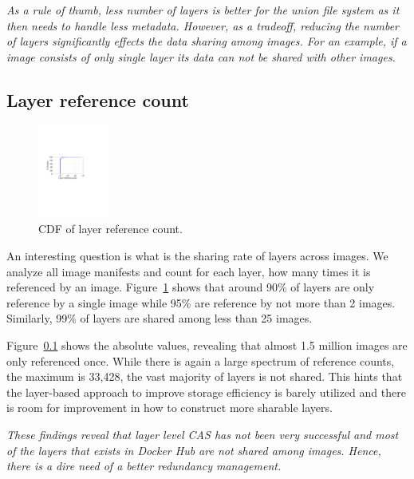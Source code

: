 \emph{As a rule of thumb, less number of layers is better for the union file
system as it then needs to handle less metadata. However, as a tradeoff,
reducing the number of layers significantly effects the data sharing among images.
For an example, if a image consists of only single layer its data can not be shared
with other images.}
%

\subsection{Layer reference count}

\begin{figure}
	\centering
	\includegraphics[width=0.21\textwidth]{graphs/shared-cnt-cdf.pdf}
	\caption{CDF of layer reference count.
	}
	\label{fig:ref_count}
\end{figure}

An interesting question is what is the sharing rate of layers across images.
We analyze all image manifests and count for each layer, how many times it is
referenced by an image. Figure~\ref{fig:ref_count} shows that around 90\% of
layers are only reference by a single image while 95\% are reference by not
more than 2 images. Similarly, 99\% of layers are shared among less than 25
images. 

Figure~\ref{} shows the absolute values, revealing that
almost 1.5 million images are only referenced once.   While there is again a large spectrum of reference counts, the maximum
is 33,428, the vast majority of layers is not shared. This hints that the
layer-based approach to improve storage efficiency is barely utilized and there
is room for improvement in how to construct more sharable layers.

\emph{These findings reveal that layer level CAS has not been very successful
and most of the layers that exists in Docker Hub are not shared among images.
Hence, there is a dire need of a better redundancy management.}

